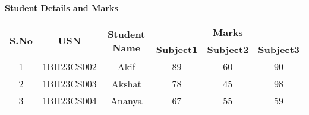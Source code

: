 \documentclass[12pt, a4paper]{article}
\begin{document}
	\centering
	\textbf{\Large{Student Details and Marks}}
	\vspace{0.1in}
	
	\begin{table}[h]
		\centering
		\begin{tabular}{|c|c|c|c|c|c|}
			\hline
			\multirow{2}{*}{\textbf{S.No}} & \multirow{2}{*}{\textbf{USN}} & \multirow{2}{*}{\textbf{Student Name}} & \multicolumn{3}{c|}{\textbf{Marks}} \\ 
			
			\cline{4-6} %
			& & & \textbf{Subject1} & \textbf{Subject2} & \textbf{Subject3} \\ %
			\hline
			\multicolumn{1}{|c|}{1} & \multicolumn{1}{c|}{1BH23CS002} & \multicolumn{1}{c|}{Akif} & 89 & 60 & 90 \\ %
			\hline
			\multicolumn{1}{|c|}{2} & \multicolumn{1}{c|}{1BH23CS003} & \multicolumn{1}{c|}{Akshat} & 78 & 45 & 98 \\
			\hline
			\multicolumn{1}{|c|}{3} & \multicolumn{1}{c|}{1BH23CS004} & \multicolumn{1}{c|}{Ananya} & 67 & 55 & 59 \\
			\hline
		\end{tabular}
	\end{table}
	
\end{document}

